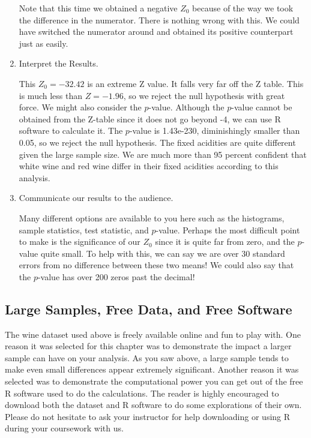 \documentclass[11pt]{book}\usepackage[]{graphicx}\usepackage[]{color}
\begin{document}
\begin{enumerate}
Note that this time we obtained a negative $Z_0$ because of the way we took the difference in the numerator. There is nothing wrong with this. We could have switched the numerator around and obtained its positive counterpart just as easily.

\item Interpret the Results.

This $Z_0 = -32.42$ is an extreme Z value.  It falls very far off the Z table.  This is much less than $Z = -1.96$, so we reject the null hypothesis with great force.  We might also consider the $p$-value. Although the $p$-value cannot be obtained from the Z-table since it does not go beyond -4, we can use R software to calculate it. The $p$-value is 1.43e-230, diminishingly smaller than 0.05, so we reject the null hypothesis. The fixed acidities are quite different given the large sample size. We are much more than 95 percent confident that white wine and red wine differ in their fixed acidities according to this analysis.

\item Communicate our results to the audience.

Many different options are available to you here such as the histograms, sample statistics, test statistic, and $p$-value.  Perhaps the most difficult point to make is the significance of our $Z_0$ since it is quite far from zero, and the $p$-value quite small. To help with this, we can say we are over 30 standard errors from no difference between these two means! We could also say that the $p$-value has over 200 zeros past the decimal!

\end{enumerate}

\subsection{Large Samples, Free Data, and Free Software }

The wine dataset used above is freely available online and fun to play with. One reason it was selected for this chapter was to demonstrate the impact a larger sample can have on your analysis. As you saw above, a large sample tends to make even small differences appear extremely significant. Another reason it was selected was to demonstrate the computational power you can get out of the free R software used to do the calculations. The reader is highly encouraged to download both the dataset and R software to do some explorations of their own. Please do not hesitate to ask your instructor for help downloading or using R during your coursework with us.
\end{document}
